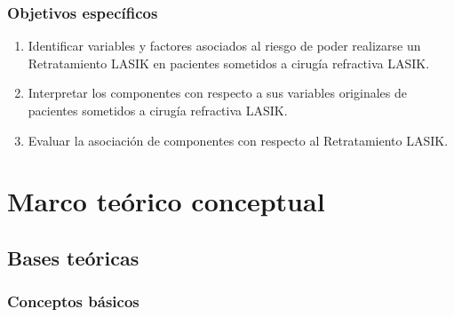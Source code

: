 \subsubsection{Objetivos específicos}
\begin{enumerate}
\item 	Identificar variables y factores asociados al riesgo de poder realizarse un Retratamiento LASIK en pacientes sometidos a cirugía refractiva LASIK.
\item   Interpretar los componentes con respecto a sus variables originales de pacientes sometidos a cirugía refractiva LASIK.
\item Evaluar la asociación de componentes con respecto al Retratamiento LASIK.
\end{enumerate}



\section{Marco teórico conceptual}


%


\subsection{Bases teóricas}
\subsubsection{Conceptos básicos }

